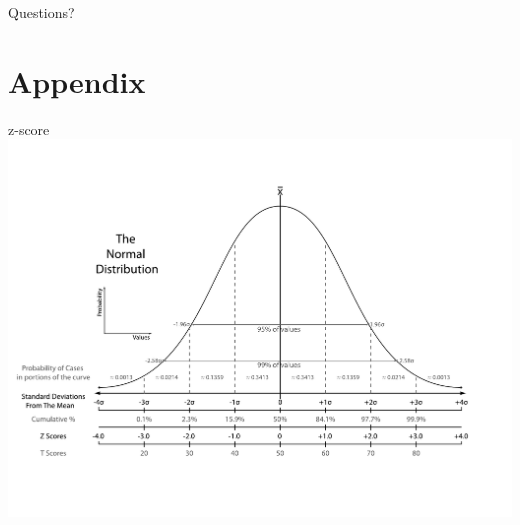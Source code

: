 \documentclass[12pt, t, xcolor=dvipsnames]{beamer}
\begin{document}
\begin{frame}[c]
  \large{Questions?}
\end{frame}


\appendix
\section{Appendix}
\begin{frame}[fragile]{z-score}
\includegraphics[width=\textwidth, keepaspectratio]{zscore}
\end{frame}
% 
% 
% 
% 
% 
% 
\end{document}
